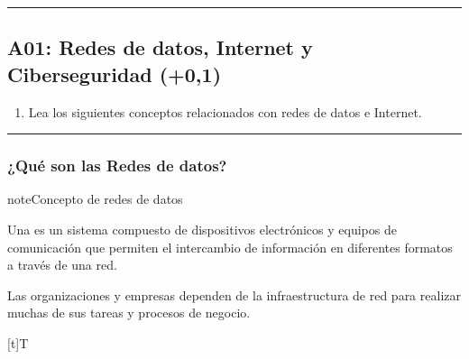 \documentclass[letterpaper,10pt,spanish]{sphinxmanual}
\let\sphinxpxdimen\pdfpxdimen\else\newdimen\sphinxpxdimen
\begin{document}
\bigskip\hrule\bigskip



\subsection{A01: Redes de datos, Internet y Ciberseguridad (+0,1)}
\label{\detokenize{1_guias/10informatica/G1003:a01-redes-de-datos-internet-y-ciberseguridad-0-1}}
\sphinxAtStartPar
{}
\begin{enumerate}
%
\item {} 
\sphinxAtStartPar
Lea los siguientes conceptos relacionados con redes de datos e Internet.

\end{enumerate}


\bigskip\hrule\bigskip



\subsubsection{¿Qué son las Redes de datos?}
\label{\detokenize{1_guias/10informatica/G1003:que-son-las-redes-de-datos}}
\begin{sphinxadmonition}{note}{Concepto de redes de datos}

\sphinxAtStartPar
Una  es un sistema compuesto de dispositivos electrónicos y equipos de comunicación que permiten el intercambio de información en diferentes formatos a través de una red.

\sphinxAtStartPar
Las organizaciones y empresas dependen de la infraestructura de red para realizar muchas de sus tareas y procesos de negocio.


\begin{savenotes}\sphinxattablestart
\sphinxthistablewithglobalstyle
\centering
\begin{tabulary}{\linewidth}[t]{T}
\sphinxtoprule
\sphinxtableatstartofbodyhook

\begin{sphinxfigure-in-table}
\centering
\capstart
\noindent\sphinxincludegraphics[width=400\sphinxpxdimen]{{image013}.png}
\label{\detokenize{1_guias/10informatica/G1003:id1}}\end{sphinxfigure-in-table}\relax
\\
\sphinxbottomrule
\end{tabulary}
\sphinxtableafterendhook\par
\sphinxattableend\end{savenotes}
\end{sphinxadmonition}
\end{document}
